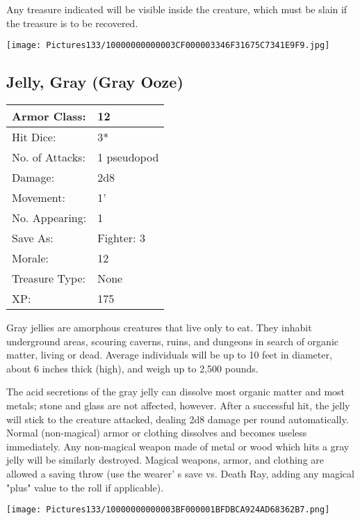 \documentclass[a4paper,twoside,openany,10pt]{book}
\begin{document}
\begin{multicols}{2}
Any treasure indicated will be visible inside the creature, which must be slain if the treasure is to be recovered.

\begin{center} \texttt{[image: Pictures133/10000000000003CF000003346F31675C7341E9F9.jpg]} \end{center}


\subsection*{Jelly, Gray (Gray Ooze)}\label{jelly-gray-gray-ooze}

\begin{tabularx}{0.50\textwidth}{@{}lX@{}}
Armor Class: & 12 \\\hline
Hit Dice: & 3*  \\\hline
No. of Attacks: & 1 pseudopod \\\hline
Damage: & 2d8 \\\hline
Movement: & 1' \\\hline
No. Appearing: & 1 \\\hline
Save As: & Fighter: 3 \\\hline
Morale: & 12 \\\hline
Treasure Type: & None \\\hline
XP: & 175 \\\hline
\end{tabularx}\medskip

Gray jellies are amorphous creatures that live only to eat. They inhabit underground areas, scouring caverns, ruins, and dungeons in search of organic matter, living or dead. Average individuals will be up to 10 feet in diameter, about 6 inches thick (high), and weigh up to 2,500 pounds.

The acid secretions of the gray jelly can dissolve most organic matter and most metals; stone and glass are not affected, however. After a successful hit, the jelly will stick to the creature attacked, dealing 2d8 damage per round automatically. Normal (non-magical) armor or clothing dissolves and becomes useless immediately. Any non-magical weapon made of metal or wood which hits a gray jelly will be similarly destroyed. Magical weapons, armor, and clothing are allowed a saving throw (use the wearer' s save vs. Death Ray, adding any magical "plus" value to the roll if applicable).

\begin{center} \texttt{[image: Pictures133/10000000000003BF000001BFDBCA924AD68362B7.png]} \end{center}



\end{multicols}
\end{document}
